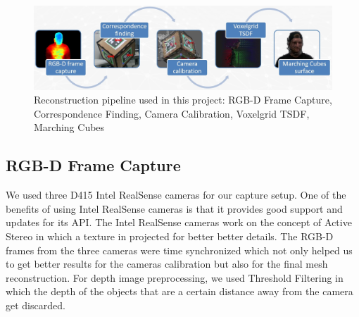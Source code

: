 \documentclass[10pt,twocolumn,letterpaper]{article}
\begin{document}
\begin{figure}[t]
\begin{center}
\includegraphics[width=1.0\linewidth]{imgs/pipeline}
\end{center}
 \caption{Reconstruction pipeline used in this project: RGB-D Frame Capture, Correspondence Finding, Camera Calibration, Voxelgrid TSDF, Marching Cubes}
\label{fig:long}
\label{fig:onecol}
\end{figure}

\subsection{RGB-D Frame Capture}
We used three D415 Intel RealSense cameras for our capture setup. One of the benefits of using Intel RealSense cameras is that it provides good support and updates for its API. The Intel RealSense cameras work on the concept of Active Stereo in which a texture in projected for better better details. The RGB-D frames from the three cameras were time synchronized which not only helped us to get better results for the cameras calibration but also for the final mesh reconstruction. For depth image preprocessing, we used Threshold Filtering in which the depth of the objects that are a certain distance away from the camera get discarded.
\end{document}
